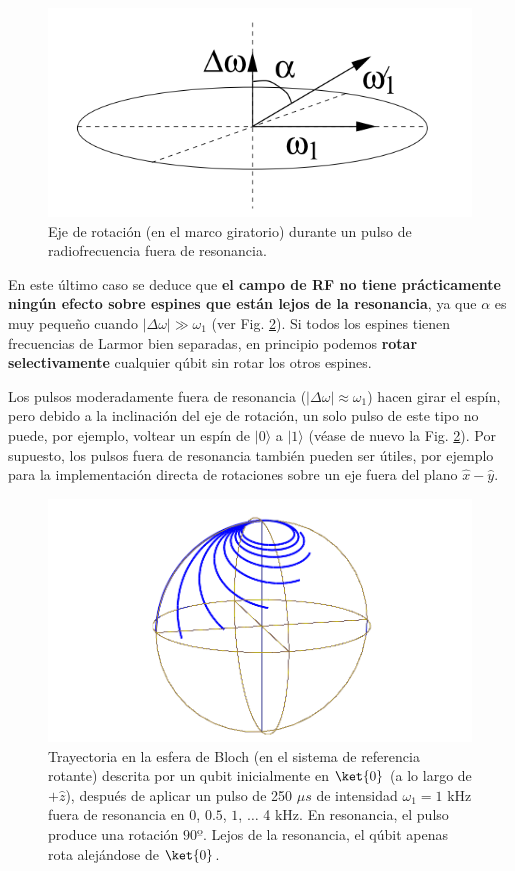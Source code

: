 \documentclass[a4paper,11pt]{book} %
\numberwithin{equation}{chapter}
\begin{document}
\begin{itemize}
\begin{itemize}
	\begin{figure}[H]
	\centering 
	\includegraphics[width=0.35\linewidth]{Figuras/Fig_Harware_NMR_nutacion_inclinada.png}
	\caption{Eje de rotación (en el marco giratorio) durante un pulso de radiofrecuencia fuera de resonancia.}
	\label{Fig_Harware_NMR_nutacion_inclinada}
	\end{figure}
	
	\end{itemize}		

\end{itemize}

En este último caso se deduce que \textbf{el campo de RF no tiene prácticamente ningún efecto sobre espines que están lejos de la resonancia}, ya que $\alpha$ es muy pequeño cuando $|\Delta \omega | \gg \omega_1$ (ver Fig. \ref{Fig_Harware_NMR_espiral_bloch_2}). Si todos los espines tienen frecuencias de Larmor bien separadas, en principio podemos \textbf{rotar selectivamente} cualquier qúbit sin rotar los otros espines.



Los pulsos moderadamente fuera de resonancia ($|\Delta \omega| \approx \omega_1$) hacen girar el espín, pero debido a la inclinación del eje de rotación, un solo pulso de este tipo no puede, por ejemplo, voltear un espín de $|0 \rangle$ a $|1 \rangle$ (véase de nuevo la Fig. \ref{Fig_Harware_NMR_espiral_bloch_2}). Por supuesto, los pulsos fuera de resonancia también pueden ser útiles, por ejemplo para la implementación directa de rotaciones sobre un eje fuera del plano $\hat{x} - \hat{y}$.

	\begin{figure}[H]
	\centering 
	\includegraphics[width=0.4\linewidth]{Figuras/Fig_Harware_NMR_espiral_bloch_2.png}
	\caption{Trayectoria en la esfera de Bloch (en el sistema de referencia rotante) descrita por un qubit inicialmente en $\ket{0}$ (a lo largo de $+\hat{z}$), después de aplicar un pulso de 250 $\mu s$ de intensidad $\omega_1 = 1$ kHz fuera de resonancia en $0$, $0.5$, $1$, $\dots$ 4 kHz. En resonancia, el pulso produce una rotación $90º$. Lejos de la resonancia, el qúbit apenas rota alejándose de $\ket{0}$.}
	\label{Fig_Harware_NMR_espiral_bloch_2}
	\end{figure}
\end{document}
